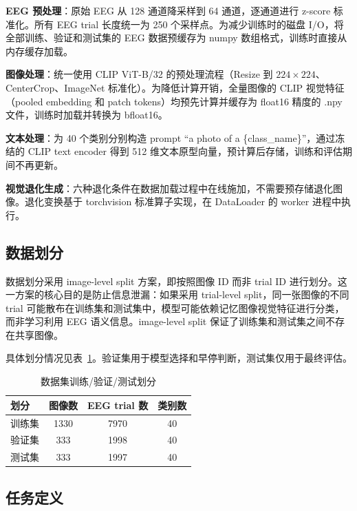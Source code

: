 \textbf{EEG 预处理}：原始 EEG 从 128 通道降采样到 64 通道，逐通道进行 z-score 标准化。所有 EEG trial 长度统一为 250 个采样点。为减少训练时的磁盘 I/O，将全部训练、验证和测试集的 EEG 数据预缓存为 numpy 数组格式，训练时直接从内存缓存加载。

\textbf{图像处理}：统一使用 CLIP ViT-B/32 的预处理流程（Resize 到 $224\times224$、CenterCrop、ImageNet 标准化）。为降低计算开销，全量图像的 CLIP 视觉特征（pooled embedding 和 patch tokens）均预先计算并缓存为 float16 精度的 .npy 文件，训练时加载并转换为 bfloat16。

\textbf{文本处理}：为 40 个类别分别构造 prompt ``a photo of a \{class\_name\}''，通过冻结的 CLIP text encoder 得到 512 维文本原型向量，预计算后存储，训练和评估期间不再更新。

\textbf{视觉退化生成}：六种退化条件在数据加载过程中在线施加，不需要预存储退化图像。退化变换基于 torchvision 标准算子实现，在 DataLoader 的 worker 进程中执行。

\subsection{数据划分}

数据划分采用 image-level split 方案，即按照图像 ID 而非 trial ID 进行划分。这一方案的核心目的是防止信息泄漏：如果采用 trial-level split，同一张图像的不同 trial 可能散布在训练集和测试集中，模型可能依赖记忆图像视觉特征进行分类，而非学习利用 EEG 语义信息。image-level split 保证了训练集和测试集之间不存在共享图像。

具体划分情况见表~\ref{tab:split}。验证集用于模型选择和早停判断，测试集仅用于最终评估。

\begin{table}[htbp]
  \centering
  \caption{数据集训练/验证/测试划分}
  \label{tab:split}
  \begin{tabular}{l c c c}
    \toprule
    划分 & 图像数 & EEG trial 数 & 类别数 \\
    \midrule
    训练集 & 1330 & 7970 & 40 \\
    验证集 & 333 & 1998 & 40 \\
    测试集 & 333 & 1997 & 40 \\
    \bottomrule
  \end{tabular}
\end{table}

\subsection{任务定义}

